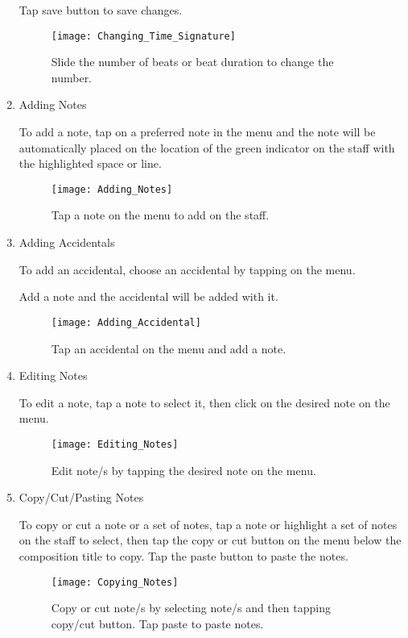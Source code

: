 \begin{enumerate}
Tap save button to save changes.

\begin{figure}[H]
	\centering
	\texttt{[image: Changing\_Time\_Signature]}
    \label{fig:changetimesig}
    \caption{Slide the number of beats or beat duration to change the number.}
\end{figure}

\item Adding Notes

To add a note, tap on a preferred note in the menu and the note will be automatically placed on the location of the green indicator on the staff with the highlighted space or line.

\begin{figure}[H]
	\centering
	\texttt{[image: Adding\_Notes]}
    \label{fig:add-note}
    \caption{Tap a note on the menu to add on the staff.}
\end{figure}

\item Adding Accidentals

To add an accidental, choose an accidental by tapping on the menu.

Add a note and the accidental will be added with it.

\begin{figure}[H]
	\centering
	\texttt{[image: Adding\_Accidental]}
    \label{fig:add-accidental}
    \caption{Tap an accidental on the menu and add a note.}
\end{figure}

\item Editing Notes

To edit a note, tap a note to select it, then click on the desired note on the menu.

\begin{figure}[H]
	\centering
	\texttt{[image: Editing\_Notes]}
    \label{fig:edit-notes}
    \caption{Edit note/s by tapping the desired note on the menu.}
\end{figure}

\item Copy/Cut/Pasting Notes

To copy or cut a note or a set of notes, tap a note or highlight a set of notes on the staff to select, then tap the copy or cut button on the menu below the composition title to copy. Tap the paste button to paste the notes.

\begin{figure}[H]
	\centering
	\texttt{[image: Copying\_Notes]}
    \label{fig:copynotes}
    \caption{Copy or cut note/s by selecting note/s and then tapping copy/cut button. Tap paste to paste notes.}
\end{figure}


\end{enumerate}
